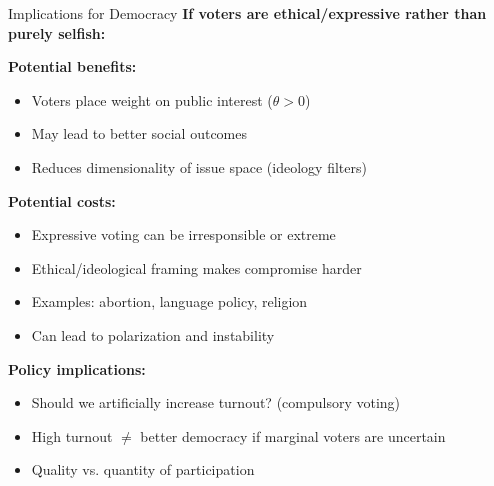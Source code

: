 \documentclass[10pt]{beamer}
\begin{document}
\begin{frame}{Implications for Democracy}
\textbf{If voters are ethical/expressive rather than purely selfish:}


\textbf{Potential benefits:}
\begin{itemize}
\item Voters place weight on public interest ($\theta > 0$)
\item May lead to better social outcomes
\item Reduces dimensionality of issue space (ideology filters)
\end{itemize}


\textbf{Potential costs:}
\begin{itemize}
\item Expressive voting can be irresponsible or extreme
\item Ethical/ideological framing makes compromise harder
\item Examples: abortion, language policy, religion
\item Can lead to polarization and instability
\end{itemize}


\textbf{Policy implications:}
\begin{itemize}
\item Should we artificially increase turnout? (compulsory voting)
\item High turnout $\neq$ better democracy if marginal voters are uncertain
\item Quality vs. quantity of participation
\end{itemize}
\end{frame}
\end{document}
